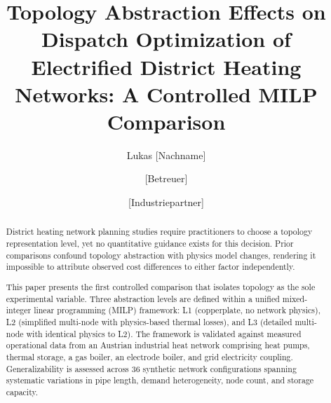 \documentclass[review,3p]{elsarticle}
\begin{document}
\begin{frontmatter}

\title{Topology Abstraction Effects on Dispatch Optimization of
Electrified District Heating Networks: A Controlled MILP Comparison}

\author[tum]{Lukas [Nachname]}
\author[tum]{[Betreuer]}
\author[partner]{[Industriepartner]}




\begin{abstract}
District heating network planning studies require practitioners to choose
a topology representation level, yet no quantitative guidance exists for
this decision. Prior comparisons confound topology abstraction with
physics model changes, rendering it impossible to attribute observed
cost differences to either factor independently.

This paper presents the first controlled comparison that isolates
topology as the sole experimental variable. Three abstraction levels
are defined within a unified mixed-integer linear programming (MILP)
framework: L1 (copperplate, no network physics), L2 (simplified
multi-node with physics-based thermal losses), and L3 (detailed
multi-node with identical physics to L2). The framework is validated
against measured operational data from an Austrian industrial heat
network comprising heat pumps, thermal storage, a gas boiler, an
electrode boiler, and grid electricity coupling. Generalizability is
assessed across 36 synthetic network configurations spanning systematic
variations in pipe length, demand heterogeneity, node count, and
storage capacity.


\end{abstract}
\end{frontmatter}
\end{document}

